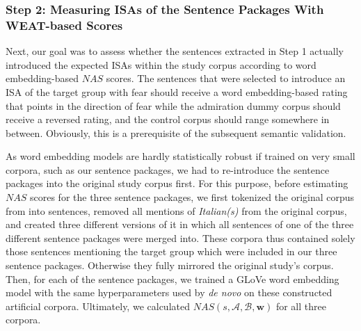 \subsubsection{Step 2: Measuring ISAs of the Sentence Packages With WEAT-based Scores}

Next, our goal was to assess whether the sentences extracted in Step 1 actually introduced the expected ISAs within the study corpus according to word embedding-based $NAS$ scores. The sentences that were selected to introduce an ISA of the target group with fear should receive a word embedding-based rating that points in the direction of fear while the admiration dummy corpus should receive a reversed rating, and the control corpus should range somewhere in between. Obviously, this is a prerequisite of the subsequent semantic validation. 

As word embedding models are hardly statistically robust if trained on very small corpora, such as our sentence packages, we had to re-introduce the sentence packages into the original study corpus first. For this purpose, before estimating $NAS$ scores for the three sentence packages, we first tokenized the original corpus from \textcite{mueller:2023:DRN} into sentences, removed all mentions of \textit{Italian(s)} from the original corpus, and created three different versions of it in which all sentences of one of the three different sentence packages were merged into. These corpora thus contained solely those sentences mentioning the target group which were included in our three sentence packages. Otherwise they fully mirrored the original study's corpus. Then, for each of the sentence packages, we trained a GLoVe word embedding model with the same hyperparameters used by \textcite{mueller:2023:DRN} \emph{de novo} on these constructed artificial corpora. Ultimately, we calculated $NAS(s, \mathcal{A}, \mathcal{B}, \boldsymbol{w})$ for all three corpora. 

